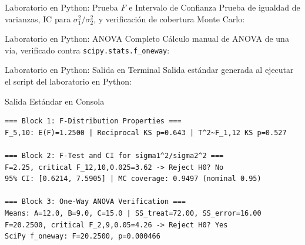 \documentclass[10pt, aspectratio=169]{beamer}
\begin{document}
\begin{frame}[fragile]{Laboratorio en Python: Prueba $F$ e Intervalo de Confianza}
  \scriptsize
  Prueba de igualdad de varianzas, IC para $\sigma_1^2/\sigma_2^2$, y verificación de cobertura Monte Carlo:
  {
  }
\end{frame}

\begin{frame}[fragile]{Laboratorio en Python: ANOVA Completo}
  \scriptsize
  Cálculo manual de ANOVA de una vía, verificado contra \texttt{scipy.stats.f\_oneway}:
  {
  }
\end{frame}

\begin{frame}[fragile]{Laboratorio en Python: Salida en Terminal}
  \scriptsize
  Salida estándar generada al ejecutar el script del laboratorio en Python:
  \vspace{0.02cm}
  \begin{block}{Salida Estándar en Consola}
    \fontsize{4pt}{5pt}\selectfont
    \begin{verbatim}
=== Block 1: F-Distribution Properties ===
F_5,10: E(F)=1.2500 | Reciprocal KS p=0.643 | T^2~F_1,12 KS p=0.527

=== Block 2: F-Test and CI for sigma1^2/sigma2^2 ===
F=2.25, critical F_12,10,0.025=3.62 -> Reject H0? No
95% CI: [0.6214, 7.5905] | MC coverage: 0.9497 (nominal 0.95)

=== Block 3: One-Way ANOVA Verification ===
Means: A=12.0, B=9.0, C=15.0 | SS_treat=72.00, SS_error=16.00
F=20.2500, critical F_2,9,0.05=4.26 -> Reject H0? Yes
SciPy f_oneway: F=20.2500, p=0.000466
    \end{verbatim}
  \end{block}
\end{frame}
\end{document}
